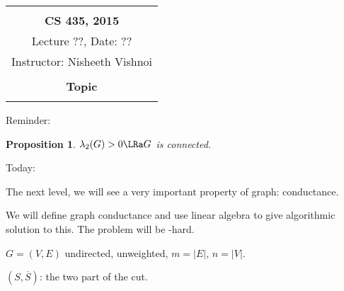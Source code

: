 \documentclass[12pt]{article}
\newtheorem{proposition}[lemma]{Proposition}
\begin{document}
\begin{center}
\begin{tabular}{|c|}
\hline
\\
{\bf CS 435, 2015} \\
 Lecture ??, Date: ??\\
Instructor: Nisheeth Vishnoi \\  \\
{\bfseries \large Topic} \\ \\ \hline
\end{tabular}
\end{center}



Reminder:

\begin{proposition}
    $\lambda_2(G) > 0 \LRa G$ is connected.
\end{proposition}

Today:

The next level, we will see a very important property of graph: conductance.

We will define graph conductance and use linear algebra to give algorithmic solution to this. The problem will be \NP-hard.


\begin{notation}
    $G = (V,E)$ undirected, unweighted, $m=\lvert E\rvert$, $n=\lvert V\rvert$.
\end{notation}

\begin{notation}[Cut]
    $(S,\overline{S})$: the two part of the cut.
\end{notation}
    
\end{document}
